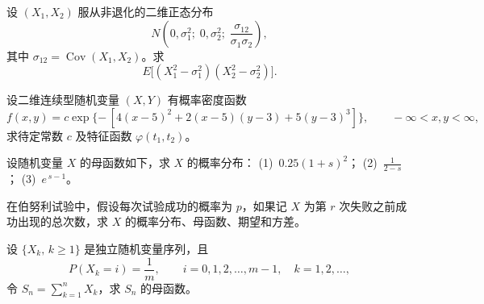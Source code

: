 \begin{homework}[4.12]
设 $(X_1,X_2)$ 服从非退化的二维正态分布  
\[
N\!\left(0,\sigma_1^2; \; 0,\sigma_2^2;\; \frac{\sigma_{12}}{\sigma_1\sigma_2}\right),
\]
其中 $\sigma_{12}=\operatorname{Cov}(X_1,X_2)$。求  
\[
E\bigl[(X_1^2-\sigma_1^2)(X_2^2-\sigma_2^2)\bigr].
\]
\end{homework}
\begin{homework}[4.13]
设二维连续型随机变量 $(X,Y)$ 有概率密度函数
\[
f(x,y)=c \exp\{-\,[4(x-5)^2 + 2(x-5)(y-3) + 5(y-3)^3]\},\qquad -\infty < x,y < \infty,
\]
求待定常数 $c$ 及特征函数 $\varphi(t_1,t_2)$。
\end{homework}

\begin{homework}[4.14]
设随机变量 $X$ 的母函数如下，求 $X$ 的概率分布：  
(1)\ $0.25(1+s)^2$；  
(2)\ $\displaystyle \frac{1}{2-s}$；  
(3)\ $e^{\,s-1}$。
\end{homework}

\begin{homework}[4.15]
在伯努利试验中，假设每次试验成功的概率为 $p$，如果记 $X$ 为第 $r$ 次失败之前成功出现的总次数，求 $X$ 的概率分布、母函数、期望和方差。
\end{homework}

\begin{homework}[4.16]
设 $\{X_k,\,k\ge 1\}$ 是独立随机变量序列，且
\[
P(X_k=i)=\frac{1}{m},\qquad i=0,1,2,\ldots,m-1,\quad k=1,2,\ldots,
\]
令 $S_n=\sum_{k=1}^{n} X_k$，求 $S_n$ 的母函数。
\end{homework}